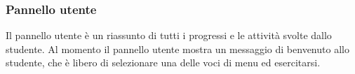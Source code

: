         \subsubsection{Pannello utente}
          Il pannello utente è un riassunto di tutti i progressi e le attività svolte dallo studente. Al momento il pannello utente mostra un messaggio di benvenuto allo studente, che è libero di selezionare una delle voci di menu ed esercitarsi.
        
        
               
	\newpage
